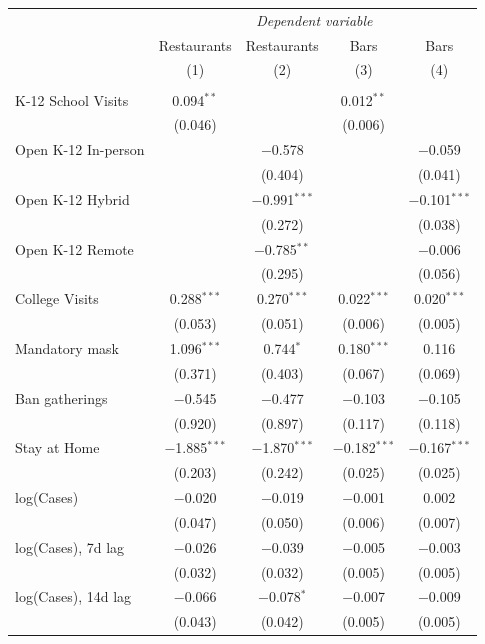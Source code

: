 \documentclass[9pt,twoside,lineno]{pnas-new}
\theoremstyle{definition}
\begin{document}
\begin{table}[!htbp]
{%
 \begin{tabular}{@{\extracolsep{1pt}}lcc|cc}
\\[-1.8ex]\hline
\hline
 & \multicolumn{4}{c}{\textit{Dependent variable}} \\
\cline{2-5}
 & Restaurants & Restaurants & Bars & Bars \\
& (1) & (2) & (3) & (4)\\
\hline
\hline \\[-1.8ex] 
  K-12 School Visits & 0.094$^{**}$ &  & 0.012$^{**}$ &  \\ 
  & (0.046) &  & (0.006) &  \\ 
  Open K-12 In-person &  & $-$0.578 &  & $-$0.059 \\ 
  &  & (0.404) &  & (0.041) \\ 
  Open K-12 Hybrid &  & $-$0.991$^{***}$ &  & $-$0.101$^{***}$ \\ 
  &  & (0.272) &  & (0.038) \\ 
  Open K-12 Remote &  & $-$0.785$^{**}$ &  & $-$0.006 \\ 
  &  & (0.295) &  & (0.056) \\  \hline
  College Visits & 0.288$^{***}$ & 0.270$^{***}$ & 0.022$^{***}$ & 0.020$^{***}$ \\ 
  & (0.053) & (0.051) & (0.006) & (0.005) \\ 
  Mandatory mask & 1.096$^{***}$ & 0.744$^{*}$ & 0.180$^{***}$ & 0.116 \\ 
  & (0.371) & (0.403) & (0.067) & (0.069) \\ 
  Ban gatherings & $-$0.545 & $-$0.477 & $-$0.103 & $-$0.105 \\ 
  & (0.920) & (0.897) & (0.117) & (0.118) \\ 
  Stay at Home & $-$1.885$^{***}$ & $-$1.870$^{***}$ & $-$0.182$^{***}$ & $-$0.167$^{***}$ \\ 
  & (0.203) & (0.242) & (0.025) & (0.025) \\ \hline
  log(Cases) & $-$0.020 & $-$0.019 & $-$0.001 & 0.002 \\ 
  & (0.047) & (0.050) & (0.006) & (0.007) \\ 
 log(Cases), 7d lag& $-$0.026 & $-$0.039 & $-$0.005 & $-$0.003 \\ 
  & (0.032) & (0.032) & (0.005) & (0.005) \\ 
 log(Cases), 14d lag & $-$0.066 & $-$0.078$^{*}$ & $-$0.007 & $-$0.009 \\ 
  & (0.043) & (0.042) & (0.005) & (0.005) \\  

\end{tabular}}
\end{table}
\end{document}
